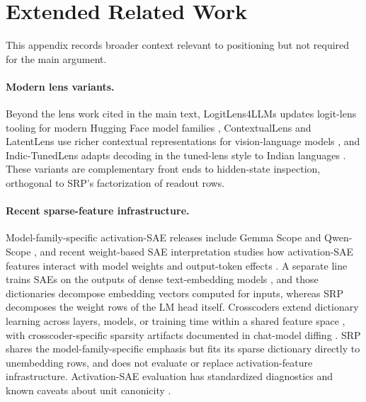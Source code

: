 \section{Extended Related Work}
\label{app:extended-related-work}

This appendix records broader context relevant to positioning but not required
for the main argument.

\paragraph{Modern lens variants.}
Beyond the lens work cited in the main text, LogitLens4LLMs updates logit-lens
tooling for modern Hugging Face model families \citep{wang2025logitlens4llms},
ContextualLens and LatentLens use richer contextual representations for
vision-language models \citep{phukan2025contextuallens,krojer2026latentlens},
and Indic-TunedLens adapts decoding in the tuned-lens style to Indian languages
\citep{panchal2026indictunedlens}. These variants are complementary front ends
to hidden-state inspection, orthogonal to SRP's factorization of readout rows.

\paragraph{Recent sparse-feature infrastructure.}
Model-family-specific activation-SAE releases include Gemma Scope and
Qwen-Scope \citep{lieberum2024gemmascope,deng2026qwenscope}, and recent
weight-based SAE interpretation studies how activation-SAE features interact
with model weights and output-token effects \citep{liu2026weightbasedsae}.
A separate line trains SAEs on the outputs of dense text-embedding models
\citep{oneill2024disentangling}, and those dictionaries decompose embedding
vectors computed for inputs, whereas SRP decomposes the weight rows of the
LM head itself.
Crosscoders extend dictionary learning across layers, models, or training
time within a shared feature space \citep{lindsey2024crosscoders}, with
crosscoder-specific sparsity artifacts documented in chat-model diffing
\citep{minder2025sparsity}. SRP
shares the model-family-specific emphasis but fits its sparse dictionary
directly to unembedding rows, and does
not evaluate or replace activation-feature infrastructure.
Activation-SAE evaluation has standardized diagnostics
\citep{karvonen2025saebench,makelov2024principled} and known caveats about
unit canonicity \citep{leask2025canonical}.

